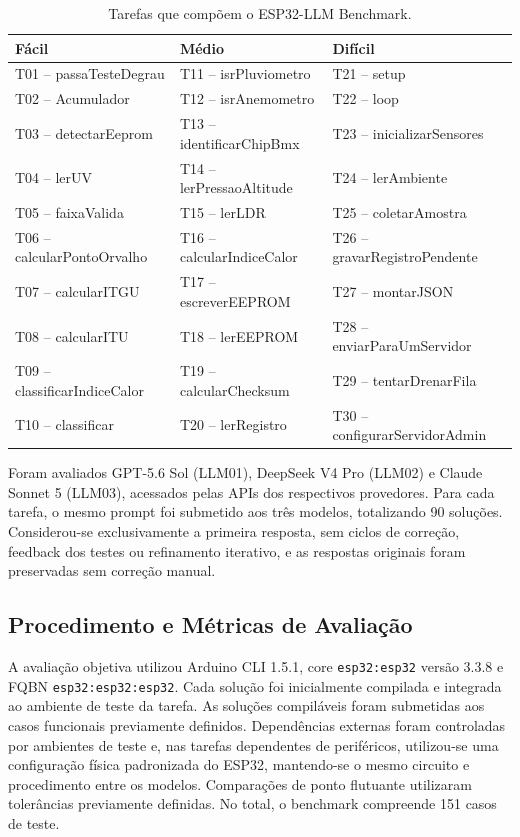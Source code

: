 \documentclass[12pt]{article}
\begin{document}
\begin{table}[ht]
\centering
\caption{Tarefas que compõem o ESP32-LLM Benchmark.}
\label{tab:tarefas}
\small
\begin{tabular}{lll}
\hline
\textbf{Fácil} & \textbf{Médio} & \textbf{Difícil} \\
\hline
T01 -- passaTesteDegrau       & T11 -- isrPluviometro          & T21 -- setup \\
T02 -- Acumulador             & T12 -- isrAnemometro           & T22 -- loop \\
T03 -- detectarEeprom         & T13 -- identificarChipBmx      & T23 -- inicializarSensores \\
T04 -- lerUV                  & T14 -- lerPressaoAltitude      & T24 -- lerAmbiente \\
T05 -- faixaValida            & T15 -- lerLDR                  & T25 -- coletarAmostra \\
T06 -- calcularPontoOrvalho   & T16 -- calcularIndiceCalor     & T26 -- gravarRegistroPendente \\
T07 -- calcularITGU           & T17 -- escreverEEPROM          & T27 -- montarJSON \\
T08 -- calcularITU            & T18 -- lerEEPROM               & T28 -- enviarParaUmServidor \\
T09 -- classificarIndiceCalor & T19 -- calcularChecksum        & T29 -- tentarDrenarFila \\
T10 -- classificar            & T20 -- lerRegistro             & T30 -- configurarServidorAdmin \\
\hline
\end{tabular}
\end{table}

Foram avaliados GPT-5.6 Sol (LLM01), DeepSeek V4 Pro (LLM02) e Claude Sonnet 5 (LLM03), acessados pelas APIs dos respectivos provedores. Para cada tarefa, o mesmo prompt foi submetido aos três modelos, totalizando 90 soluções. Considerou-se exclusivamente a primeira resposta, sem ciclos de correção, feedback dos testes ou refinamento iterativo, e as respostas originais foram preservadas sem correção manual.

\subsection{Procedimento e Métricas de Avaliação}
\label{sec:procedimento}

A avaliação objetiva utilizou Arduino CLI 1.5.1, core \texttt{esp32:esp32} versão 3.3.8 e FQBN \texttt{esp32:esp32:esp32}. Cada solução foi inicialmente compilada e integrada ao ambiente de teste da tarefa. As soluções compiláveis foram submetidas aos casos funcionais previamente definidos. Dependências externas foram controladas por ambientes de teste e, nas tarefas dependentes de periféricos, utilizou-se uma configuração física padronizada do ESP32, mantendo-se o mesmo circuito e procedimento entre os modelos. Comparações de ponto flutuante utilizaram tolerâncias previamente definidas. No total, o benchmark compreende 151 casos de teste.
\end{document}
